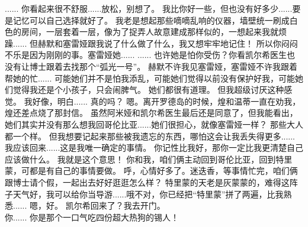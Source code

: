 \documentclass[openany]{book}
\begin{document}
\begin{dialogue}
     ......
     你看起来很不舒服......放松，别想了。
     我比你好一些，但也没有好多少......要是记忆可以自己选择就好了。
     我老是想起那些嘀嘀乱响的仪器，墙壁统一刷成白色的房间，一层套着一层，像为了捉弄人故意建成那样似的，一想起来我就烦躁......
     但赫默和塞雷娅跟我说了什么做了什么，我又想牢牢地记住！
     所以你闷闷不乐是因为刚刚的事。塞雷娅她......
     ......
     也许她是怕你受伤？你看凯尔希医生也没有让博士跟着去找那个“弧光一号”。
     赫默不许我见塞雷娅，塞雷娅不许我跟着帮她的忙......
     可能她们并不是怕我添乱，可能她们觉得以前没有保护好我，可能她们觉得我还是个小孩子，只会闹脾气。
     她们都很有道理。
     但我超级讨厌这种感觉。
     我好像，明白......
     真的吗？
     嗯。离开罗德岛的时候，煌和温蒂一直在劝我，煌还差点烧了那封信。
     虽然阿米娅和凯尔希医生最后还是同意了，但我能看出，她们其实并没有那么想我回哥伦比亚......她们很担心，就像塞雷娅一样？
     那些大人都一个样。
     但我想要记起来那些被我遗忘的东西，哪怕这会让我丢失得更多......
     我应该回来......这是我唯一确定的事情。
     你记性比我好，那你一定比我更清楚自己应该做什么。
     我就是这个意思！
     你和我，咱们俩主动回到哥伦比亚，回到特里蒙，可都是有自己的事情要做。
     呼，心情好多了。迷迭香，等事情忙完，咱们俩跟博士请个假，一起出去好好逛逛怎么样？
     特里蒙的天老是灰蒙蒙的，难得这阵子天气好，我可以给你当导游......哦不对，你已经把“特里蒙”拼了两遍，比我熟悉......
     嗯，好。
     凯尔希回来了？我去开门。
    \\
     你......
     你是那个一口气吃四份超大热狗的锡人！
\end{dialogue}
\end{document}
